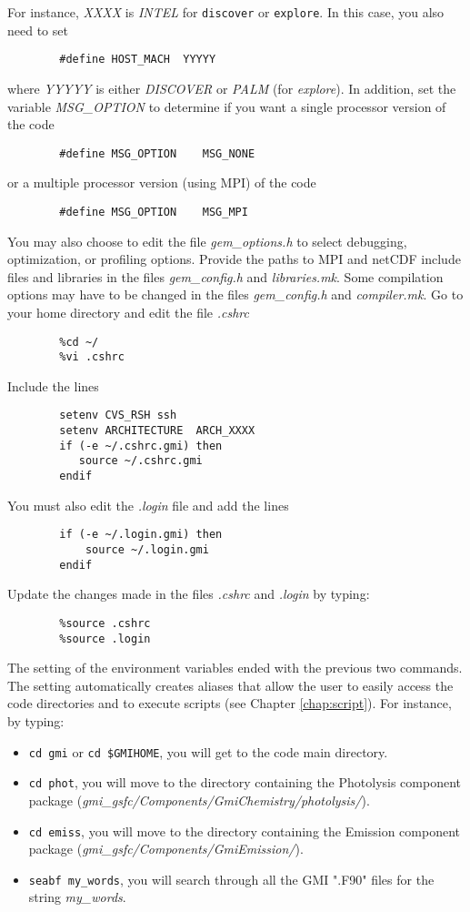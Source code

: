 For instance, {\em XXXX} is {\em INTEL} for {\tt discover} or {\tt explore}. 
In this case, you also need to set
%
\begin{verbatim}
        #define HOST_MACH  YYYYY
\end{verbatim}
%
where {\em YYYYY} is either {\em DISCOVER} or {\em PALM} (for {\em explore}).
\newline
In addition, set the variable {\em MSG\_OPTION} to determine if you want a
single processor version of the code
%
\begin{verbatim}
        #define MSG_OPTION    MSG_NONE
\end{verbatim}
%
or a multiple processor version (using MPI) of the code
%
\begin{verbatim}
        #define MSG_OPTION    MSG_MPI
\end{verbatim}

You may also choose to edit the file {\em gem\_options.h} to select 
debugging, optimization, or profiling options. 
Provide the paths to MPI and netCDF include 
files and libraries in the files {\em gem\_config.h} and {\em libraries.mk}.  
Some compilation options may have to be changed in the files
{\em gem\_config.h} and {\em compiler.mk}.
%
Go to your home directory and edit the file {\em .cshrc}
%
\begin{verbatim}
        %cd ~/
        %vi .cshrc
\end{verbatim}
%
Include the lines
%
\begin{verbatim}
        setenv CVS_RSH ssh
        setenv ARCHITECTURE  ARCH_XXXX
        if (-e ~/.cshrc.gmi) then
           source ~/.cshrc.gmi
        endif
\end{verbatim}
%
You must also edit the {\em .login} file and add the lines
%
\begin{verbatim}
        if (-e ~/.login.gmi) then
            source ~/.login.gmi
        endif
\end{verbatim}
%
Update the changes made in the files {\em .cshrc} and {\em .login} by typing:
%
\begin{verbatim}
        %source .cshrc
        %source .login
\end{verbatim}
%

The setting of the environment variables ended with the previous two commands.
The setting automatically creates aliases that allow the user to easily access
the code directories and to execute scripts (see Chapter \ref{chap:script}).
For instance, by typing:
%
\begin{itemize}
\item {\tt cd gmi} or {\tt cd \$GMIHOME}, you will get to the code main directory.
\item {\tt cd phot}, you will move to the directory containing the Photolysis
      component package ({\em gmi\_gsfc/Components/GmiChemistry/photolysis/}).
\item {\tt cd emiss}, you will move to the directory containing the Emission
      component package ({\em gmi\_gsfc/Components/GmiEmission/}).
\item {\tt seabf my\_words}, you will search through all the GMI ".F90" files
      for the string {\em my\_words}.
\end{itemize}
%
%

